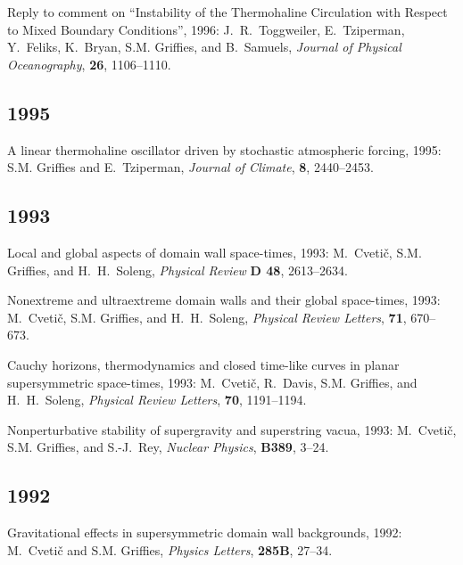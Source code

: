 \begin{etaremune}
\item Reply to comment on ``Instability of the Thermohaline Circulation with Respect to Mixed Boundary Conditions'', 1996: J.\ R.\ Toggweiler, E.\ Tziperman, Y.\ Feliks, K.\ Bryan, S.M. Grif\/f\/ies, and B.\ Samuels, {\em Journal of Physical
Oceanography}, {\bf 26}, 1106--1110.

\subsection*{\sc \color{Maroon} 1995}
  
\item A linear thermohaline oscillator driven by stochastic atmospheric forcing, 1995: S.M. Grif\/f\/ies and E.\ Tziperman, {\em Journal of Climate}, {\bf 8}, 2440--2453.

\subsection*{\sc \color{Maroon} 1993}

\item Local and global aspects of domain wall space-times, 1993: M.\ Cveti\v c, S.M. Grif\/f\/ies, and H.\ H.\ Soleng, {\em Physical Review} {\bf D 48}, 2613--2634.

\item Nonextreme and ultraextreme domain walls and their global space-times, 1993: M.\ Cveti\v c, S.M. Grif\/f\/ies, and H.\ H.\ Soleng, {\em Physical Review Letters}, {\bf 71}, 670--673.

\item Cauchy horizons, thermodynamics and closed time-like curves in planar supersymmetric space-times, 1993: M.\ Cveti\v c, R.\ Davis, S.M. Grif\/f\/ies, and H.\ H.\ Soleng, {\em Physical Review Letters}, {\bf 70}, 1191--1194.


\item Nonperturbative stability of supergravity and superstring vacua, 1993: M.\ Cveti\v c, S.M. Grif\/f\/ies, and S.-J.\ Rey, {\em Nuclear Physics}, {\bf B389}, 3--24.

\subsection*{\sc \color{Maroon} 1992}
 
\item Gravitational effects in supersymmetric domain wall backgrounds, 1992: M.\ Cveti\v c and S.M. Grif\/f\/ies, {\em Physics Letters}, {\bf 285B}, 27--34.


\end{etaremune}
